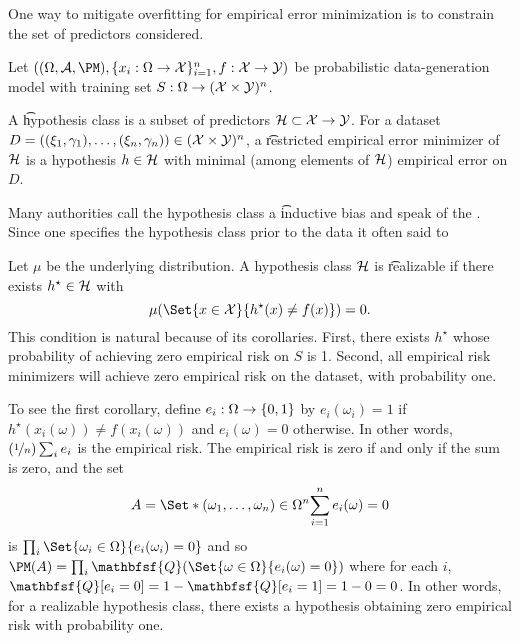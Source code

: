 

One way to mitigate overfitting for empirical error minimization is to constrain the set of predictors considered.


Let $((\Omega, \CA, \PM), \set{x_i: \Omega \to \CX}_{i=1}^{n}, f: \CX \to \CY)$ be probabilistic data-generation model with training set $S: \Omega \to (\mathcal{X} \times \mathcal{Y})^{n}$.

A \t{hypothesis class} is a subset of predictors $\mathcal{H} \subset \mathcal{X} \to \mathcal{Y}$.
For a dataset $D = ((\xi_1, \gamma_1), \dots, (\xi_n, \gamma_n)) \in (\mathcal{X} \times \mathcal{Y})^n$, a \t{restricted empirical error minimizer} of $\mathcal{H}$ is a hypothesis $h \in \mathcal{H}$ with minimal (among elements of $\mathcal{H}$) empirical error on $D$.


Many authorities call the hypothesis class a \t{inductive bias} and speak of  the .
Since one specifies the hypothesis class prior to the data it often said to 


Let $\mu$ be the underlying distribution. 
A hypothesis class $\mathcal{H}$ is \t{realizable} if there exists $h^{\star} \in \mathcal{H}$ with
\[
	\mu(\Set{x \in \CX}{h^\star(x) \neq f(x)}) = 0.%
\]
This condition is natural because of its corollaries.
First, there exists $h^\star$ whose probability of achieving zero empirical risk on $S$ is 1.
Second, all empirical risk minimizers will achieve zero empirical risk on the dataset, with probability one.

To see the first corollary, define $e_i: \Omega \to \{0, 1\}$ by $e_i(\omega_i) = 1$ if $h^\star(x_i(\omega)) \neq f(x_i(\omega))$ and $e_i(\omega) = 0$ otherwise.
In other words, $(\nicefrac{1}{n})\sum_{i} e_i$ is the empirical risk.
The empirical risk is zero if and only if the sum is zero, and the set
\[
A = \Set*{(\omega_1, \dots, \omega_n) \in \Omega^n}{\sum_{i=1}^{n} e_i(\omega) = 0}
\]
is $\prod_{i} \Set{\omega_i \in \Omega}{e_i(\omega_i) = 0}$ and so
$\PM(A) = \prod_{i} \mathbfsf{Q}(\Set{\omega \in \Omega}{e_i(\omega) = 0})$
where for each $i$, $\mathbfsf{Q}[e_i = 0] = 1 - \mathbfsf{Q}[e_i = 1] = 1 - 0 = 0$.
In other words, for a realizable hypothesis class, there exists a hypothesis obtaining zero empirical risk with probability one.

